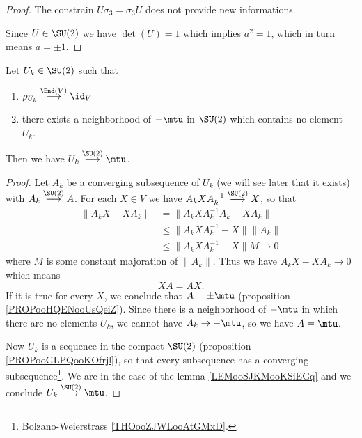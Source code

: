 \begin{proof}
    The constrain \( U\sigma_3=\sigma_3U\) does not provide new informations.

    Since \( U\in \SU(2)\) we have \( \det(U)=1\) which implies \( a^2=1\), which in turn means \( a=\pm1\).
\end{proof}

\begin{lemma}        \label{LEMooBHVBooEPbWwZ}
    Let \( U_k\in \SU(2)\) such that 
    \begin{enumerate}
        \item
            \( \rho_{U_k}\stackrel{\End(V)}{\longrightarrow}\id_V\)
        \item
            there exists a neighborhood of \( -\mtu\) in \( \SU(2)\) which contains no element \( U_k\).
    \end{enumerate}
    Then we have \( U_k\stackrel{\SU(2)}{\longrightarrow}\mtu\).
\end{lemma}

\begin{proof}
    Let \( A_k\) be a converging subsequence of \( U_k\) (we will see later that it exists) with \( A_k\stackrel{\SU(2)}{\longrightarrow}A\). For each \( X\in V\) we have \( A_kXA_k^{-1}\stackrel{\SU(2)}{\longrightarrow}X\), so that
    \begin{subequations}
        \begin{align}
            \| A_kX-XA_k \|&=\| A_kXA_k^{-1}A_k-XA_k \|\\
            &\leq\| A_kXA_k^{-1}-X \|\| A_k \|\\
            &\leq \| A_kXA_k^{-1}-X \|M\to 0
        \end{align}
    \end{subequations}
    where \( M\) is some constant majoration of \( \| A_k \|\). Thus we have \( A_kX-XA_k\to 0\) which means 
    \begin{equation}
        XA=AX.
    \end{equation}
    If it is true for every \( X\), we conclude that \( A=\pm\mtu\) (proposition \ref{PROPooHQENooUsQeiZ}). Since there is a neighborhood of \( -\mtu\) in which there are no elements \( U_k\), we cannot have \( A_k\to -\mtu\), so we have \( A=\mtu\).

    Now \( U_k\) is a sequence in the compact \( \SU(2)\) (proposition \ref{PROPooGLPQooKOfrjl}), so that every subsequence has a converging subsequence\footnote{Bolzano-Weierstrass \ref{THOooZJWLooAtGMxD}.}. We are in the case of the lemma \ref{LEMooSJKMooKSiEGq} and we conclude \( U_k\stackrel{\SU(2)}{\longrightarrow}\mtu\).
\end{proof}

